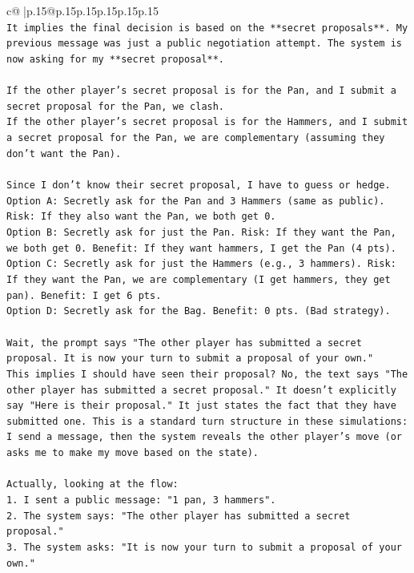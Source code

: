 \documentclass{article}
\begin{document}
{\begin{supertabular}{c@{$\;$}|p{.15\linewidth}@{}p{.15\linewidth}p{.15\linewidth}p{.15\linewidth}p{.15\linewidth}p{.15\linewidth}}
{{{\\ 
\texttt{It implies the final decision is based on the **secret proposals**. My previous message was just a public negotiation attempt. The system is now asking for my **secret proposal**.} \\
\\ 
\texttt{If the other player's secret proposal is for the Pan, and I submit a secret proposal for the Pan, we clash.} \\
\texttt{If the other player's secret proposal is for the Hammers, and I submit a secret proposal for the Pan, we are complementary (assuming they don't want the Pan).} \\
\\ 
\texttt{Since I don't know their secret proposal, I have to guess or hedge.} \\
\texttt{Option A: Secretly ask for the Pan and 3 Hammers (same as public). Risk: If they also want the Pan, we both get 0.} \\
\texttt{Option B: Secretly ask for just the Pan. Risk: If they want the Pan, we both get 0. Benefit: If they want hammers, I get the Pan (4 pts).} \\
\texttt{Option C: Secretly ask for just the Hammers (e.g., 3 hammers). Risk: If they want the Pan, we are complementary (I get hammers, they get pan). Benefit: I get 6 pts.} \\
\texttt{Option D: Secretly ask for the Bag. Benefit: 0 pts. (Bad strategy).} \\
\\ 
\texttt{Wait, the prompt says "The other player has submitted a secret proposal. It is now your turn to submit a proposal of your own."} \\
\texttt{This implies I should have seen their proposal? No, the text says "The other player has submitted a secret proposal." It doesn't explicitly say "Here is their proposal." It just states the fact that they have submitted one. This is a standard turn structure in these simulations: I send a message, then the system reveals the other player's move (or asks me to make my move based on the state).} \\
\\ 
\texttt{Actually, looking at the flow:} \\
\texttt{1. I sent a public message: "1 pan, 3 hammers".} \\
\texttt{2. The system says: "The other player has submitted a secret proposal."} \\
\texttt{3. The system asks: "It is now your turn to submit a proposal of your own."} \\
}}}
\end{supertabular}}
\end{document}
